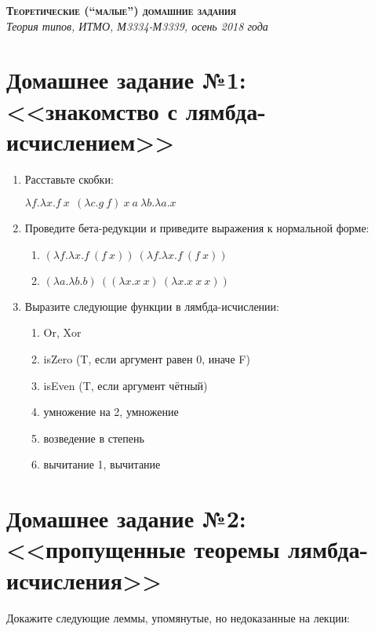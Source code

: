 \documentclass[10pt,a4paper,oneside]{article}
\begin{document}
\begin{center}{\Large\textsc{\textbf{Теоретические (``малые'') домашние задания}}}\\
             \it Теория типов, ИТМО, М3334-М3339, осень 2018 года\end{center}

\section*{Домашнее задание №1: <<знакомство с лямбда-исчислением>>}

\begin{enumerate}
\item Расставьте скобки:

$\lambda f.\lambda x.f\ x\ \ (\lambda c.g\ f)\ x\ a\ \lambda b.\lambda a.x$

\item Проведите бета-редукции и приведите выражения к нормальной форме:

\begin{enumerate}
\item $(\lambda f.\lambda x.f\ (f\ x))\ (\lambda f.\lambda x.f\ (f\ x))$
\item $(\lambda a.\lambda b.b)\ ((\lambda x.x\ x)\ (\lambda x.x\ x\ x))$
\end{enumerate}

\item Выразите следующие функции в лямбда-исчислении:

\begin{enumerate}
\item Or, Xor
\item isZero (T, если аргумент равен 0, иначе F)
\item isEven (T, если аргумент чётный)
\item умножение на 2, умножение
\item возведение в степень
\item вычитание 1, вычитание
\end{enumerate}
\end{enumerate}

\section*{Домашнее задание №2: <<пропущенные теоремы лямбда-исчисления>>}

Докажите следующие леммы, упомянутые, но недоказанные на лекции:
\end{document}
